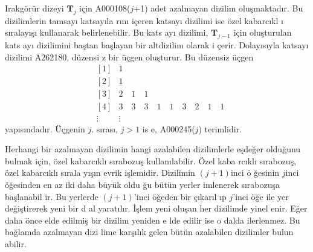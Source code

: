 \documentclass[a4paper,10pt]{article}
\begin{document}
Irakg\"or\"ur dizeyi $\mathbf{T}_{j}$ i\c{c}in A000108($j$+1) %
adet a\-zal\-ma\-yan di\-zi\-lim o\-lu\c{s}\-mak\-ta\-d\i r. Bu %
di\-zi\-lim\-le\-rin tamsay{\i} katsay\i la%
r\i n{\i} i\c{c}eren katsay{\i} dizilimi ise \"o\-zel kabarc\i kl%
{\i} s\i ralay\i \c{s}{\i} kul\-la\-narak belirlenebilir. Bu kats%
ay{\i} dizilimi, $\mathbf{T}_{j-1}$ i\c{c}in olu\c{s}turulan kats%
ay{\i} dizilimini ba\c{s}tan ba\c{s}layan bir altdizilim olarak i%
\c{c}erir. Dolay\i s\i yla katsay{\i} dizilimi A262180, d\"uzensi%
z bir \"u\c{c}gen olu\c{s}turur. Bu d\"uzensiz \"u\c{c}gen %
\begin{eqnarray}
&[1]& 1 \nonumber\\
&[2]& 1 \nonumber\\
&[3]& 2\quad 1\quad 1 \nonumber\\
&[4]& 3\quad 3\quad 3\quad 1\quad 1\quad 3\quad %
2\quad 1\quad 1 \nonumber\\
&\vdots&  \vdots
\end{eqnarray}
yap\i s\i ndad\i r. \"U\c{c}\-ge\-nin $j.$ s{\i}ras{\i}, $j>1$ is%
e, A000245($j$) terimlidir. %

Herhangi bir azalmayan dizilimin hangi azalabilen dizilim\-lerle %
e\c{s}\-de\-\u{ger} ol\-du\-\u{g}u\-nu bul\-mak i\c{c}in, \"ozel %
kabar\-c\i k\-l{\i} s\i rabozu\c{s} kullan\i labilir. \"Ozel kaba%
rc\i kl{\i} s\i rabozu\c{s}, \"ozel kabarc\i kl{\i} s{\i}\-ra\-la%
y{\i}\c{s}\i n evrik i\c{s}lemidir. Dizili\-min $(j+1)$in\-ci \"o%
\u{g}esinin $j$inci \"o\u{g}esinden en az iki daha b\"uy\"uk oldu%
\u{g}u b\"ut\"un yerler imlenerek s\i rabozu\c{s}a ba\c{s}lanabil%
ir. Bu yer\-ler\-de $(j+1)$'inci \"o\u{g}eden bir \c{c}\i kar\i l%
\i p $j$'inci \"o\u{g}e ile yer de\u{g}i\c{s}\-tirerek yeni bir d%
al yarat\i l\i r. \.I\c{s}lem yeni olu\c{s}an her dizilimde yinel%
enir. E\u{g}er daha \"once elde edilmi\c{s} bir dizilim yeniden e%
lde edilir ise o dalda ilerlenmez. Bu ba\u{g}lamda azalmayan dizi%
lime kar\c{s}\i l\i k gelen b\"ut\"un azalabilen dizilimler bulun%
abilir. %
\end{document}
